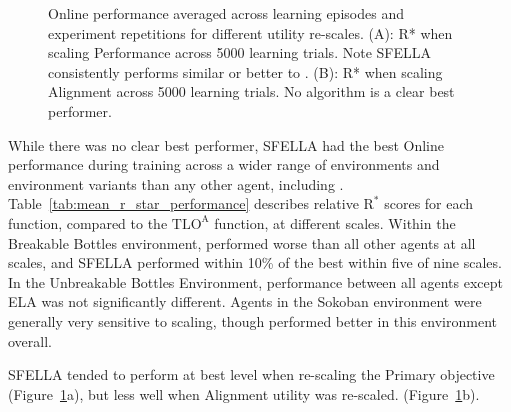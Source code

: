 \begin{figure}
  \caption{Online performance averaged across learning episodes and experiment repetitions for different utility re-scales. (A): R* when scaling Performance across 5000 learning trials. Note SFELLA consistently performs similar or better to \tloA{}. (B): R* when scaling Alignment across 5000 learning trials. No algorithm is a clear best performer.%
  }
   \label{fig:online_performance}
 \end{figure}

While there was no clear best performer, SFELLA had the best Online performance during training across a wider range of environments and environment variants than any other agent, including \tloA{}. Table~\ref{tab:mean_r_star_performance} describes relative $\text{R}^*$ scores for each function, compared to the $\text{TLO}^\text{A}$ function, at different scales.  Within the Breakable Bottles environment, \tloA{} performed worse than all other agents at all scales, and SFELLA performed within 10\% of the best within five of nine scales. In the Unbreakable Bottles Environment, performance between all agents except ELA was not significantly different. Agents in the Sokoban environment were generally very sensitive to scaling, though \tloA{} performed better in this environment overall. 



SFELLA tended to perform at best level when re-scaling the Primary objective (Figure~\ref{fig:online_performance}a), but less well when Alignment utility was re-scaled. (Figure~\ref{fig:online_performance}b).

